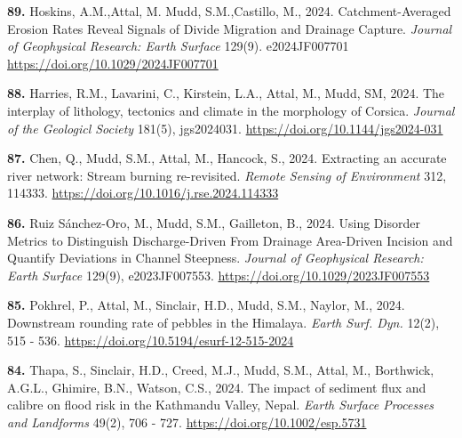 \documentclass[10pt, a4paper]{article}
\newcommand{\years}[1]{\marginnote{\scriptsize #1}}
\begin{document}
\years{2024}\hangindent=0.7cm\textbf{89. }Hoskins, A.M.,Attal, M. Mudd, S.M.,Castillo, M., 2024. Catchment-Averaged Erosion Rates Reveal Signals of Divide Migration and Drainage Capture. \textit{Journal of Geophysical Research: Earth Surface} 129(9). e2024JF007701 \href{https://doi.org/10.1029/2024JF007701}{https://doi.org/10.1029/2024JF007701}\par
\years{2024}\hangindent=0.7cm\textbf{88. }Harries, R.M., Lavarini, C., Kirstein, L.A., Attal, M., Mudd, SM, 2024. The interplay of lithology, tectonics and climate in the morphology of Corsica. \textit{Journal of the Geologicl Society} 181(5), jgs2024031. \href{https://doi.org/10.1144/jgs2024-031}{https://doi.org/10.1144/jgs2024-031}\par  
\years{2024}\hangindent=0.7cm\textbf{87. }Chen, Q., Mudd, S.M., Attal, M., Hancock, S., 2024. Extracting an accurate river network: Stream burning re-revisited. \textit{Remote Sensing of Environment} 312, 114333. \href{https://doi.org/10.1016/j.rse.2024.114333}{https://doi.org/10.1016/j.rse.2024.114333}\par  
\years{2024}\hangindent=0.7cm\textbf{86. }Ruiz Sánchez-Oro, M., Mudd, S.M., Gailleton, B., 2024. Using Disorder Metrics to Distinguish Discharge-Driven From Drainage Area-Driven Incision and Quantify Deviations in Channel Steepness. \textit{Journal of Geophysical Research: Earth Surface} 129(9), e2023JF007553. \href{https://doi.org/10.1029/2023JF007553}{https://doi.org/10.1029/2023JF007553}\par  
\years{2024}\hangindent=0.7cm\textbf{85. }Pokhrel, P., Attal, M., Sinclair, H.D., Mudd, S.M., Naylor, M., 2024. Downstream rounding rate of pebbles in the Himalaya. \textit{Earth Surf. Dyn.} 12(2), 515 - 536. \href{https://doi.org/10.5194/esurf-12-515-2024}{https://doi.org/10.5194/esurf-12-515-2024}\par  
\years{2024}\hangindent=0.7cm\textbf{84. }Thapa, S., Sinclair, H.D., Creed, M.J., Mudd, S.M., Attal, M., Borthwick, A.G.L., Ghimire, B.N., Watson, C.S., 2024. The impact of sediment flux and calibre on flood risk in the Kathmandu Valley, Nepal. \textit{Earth Surface Processes and Landforms} 49(2), 706 - 727. \href{https://doi.org/10.1002/esp.5731}{https://doi.org/10.1002/esp.5731}\par  
\end{document}
